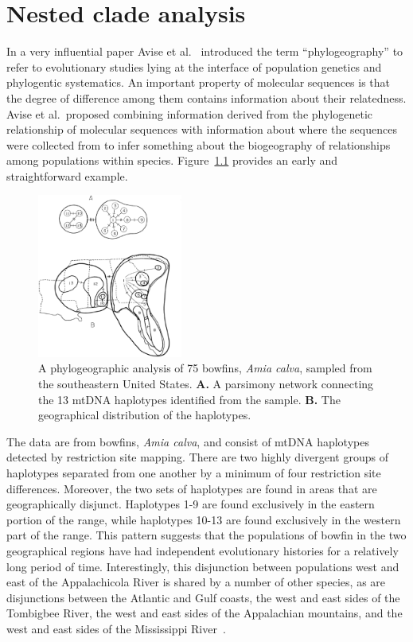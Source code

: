 \chapter{Nested clade analysis}

In a very influential paper Avise et al.~\cite{Avise-etal-1987}
introduced the term ``phylogeography'' to refer to evolutionary
studies lying at the interface of population genetics and phylogentic
systematics. An important property of molecular sequences is that the
degree of difference among them contains information about their
relatedness. Avise et al.\ proposed combining information derived from
the phylogenetic relationship of molecular sequences with information
about where the sequences were collected from to infer something about
the biogeography of relationships among populations within
species. Figure~\ref{fig:bowfin} provides an early and straightforward
example.

\begin{figure}
\begin{center}
\includegraphics[width=0.425\textwidth]{bowfin-phylogeography.eps}
\end{center}
\caption{A phylogeographic analysis of 75 bowfins, {\it Amia calva\/},
  sampled from the southeastern United States. {\bf A.} A parsimony
  network connecting the 13 mtDNA haplotypes identified from the
  sample. {\bf B.} The geographical distribution of the
  haplotypes.}\label{fig:bowfin}
\end{figure}

The data are from bowfins, {\it Amia calva}, and consist of mtDNA
haplotypes detected by restriction site mapping. There are two highly
divergent groups of haplotypes separated from one another by a minimum
of four restriction site differences. Moreover, the two sets of
haplotypes are found in areas that are geographically
disjunct. Haplotypes 1-9 are found exclusively in the eastern portion
of the range, while haplotypes 10-13 are found exclusively in the
western part of the range. This pattern suggests that the populations
of bowfin in the two geographical regions have had independent
evolutionary histories for a relatively long period of
time. Interestingly, this disjunction between populations west and
east of the Appalachicola River is shared by a number of other
species, as are disjunctions between the Atlantic and Gulf coasts, the
west and east sides of the Tombigbee River, the west and east sides of
the Appalachian mountains, and the west and east sides of the
Mississippi River~\cite{Soltis-etal-2006}.

